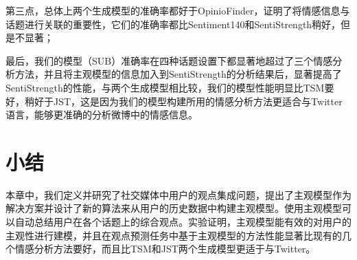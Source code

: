 第三点，总体上两个生成模型的准确率都好于OpinioFinder，证明了将情感信息与话题进行关联的重要性，它们的准确率都比Sentiment140和SentiStrength稍好，但是不显著；

最后，我们的模型（SUB）准确率在四种话题设置下都显著地超过了三个情感分析方法，并且将主观模型的信息加入到SentiStrength的分析结果后，显著提高了SentiStrength的性能，与两个生成模型相比较，我们的模型性能明显比TSM要好，稍好于JST，这是因为我们的模型构建所用的情感分析方法更适合与Twitter语言，能够更准确的分析微博中的情感信息。

\section{小结}
\label{sec6}
本章中，我们定义并研究了社交媒体中用户的观点集成问题，提出了主观模型作为解决方案并设计了新的算法来从用户的历史数据中构建主观模型。使用主观模型可以自动总结用户在各个话题上的综合观点。实验证明，主观模型能有效的对用户的主观性进行建模，并且在观点预测任务中基于主观模型的方法性能显著比现有的几个情感分析方法要好，而且比TSM和JST两个生成模型更适于与Twitter。
